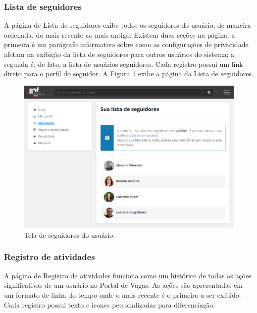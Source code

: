 \documentclass[cic,tc]{iiufrgs}
\begin{document}
\subsubsection{Lista de seguidores}
\label{PDVFunConfiguracoesListaSeguidores}

A página de Lista de seguidores exibe todos os seguidores do usuário, de maneira ordenada, do mais recente ao mais antigo. Existem duas seções na página: a primeira é um parágrafo informativo sobre como as configurações de privacidade afetam na exibição da lista de seguidores para outros usuários do sistema; a segunda é, de fato, a lista de usuários seguidores. Cada registro possui um link direto para o perfil do seguidor. A Figura \ref{telaConfigSeguidores} exibe a página da Lista de seguidores.

\begin{figure}[ht]
    \caption{Tela de seguidores do usuário.}
        \begin{center}
            \includegraphics[width=1\textwidth]{figuras/config_05.png}
        \end{center}
    \label{telaConfigSeguidores}
\end{figure}

\subsubsection{Registro de atividades}
\label{PDVFunConfiguracoesLog}

A página de Registro de atividades funciona como um histórico de todas as ações significativas de um usuário no Portal de Vagas. As ações são apresentadas em um formato de linha do tempo onde o mais recente é o primeiro a ser exibido. Cada registro possui texto e ícones personalizadas para diferenciação.
\end{document}
